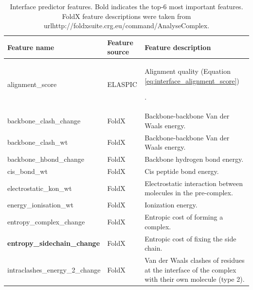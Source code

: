 \begin{table}[tb]
	\centering
	\caption[Interface predictor features.]{Interface predictor features. Bold indicates the top-6 most important features. FoldX feature descriptions were taken from url{http://foldxsuite.crg.eu/command/AnalyseComplex}.}
	\label{tab:interface_features}
	\begin{tabular}{ l | l | p{8cm} }
		\toprule
		Feature name                          & Feature source & Feature description                                                                                 \\
		\midrule
		alignment\_score                      & ELASPIC        & Alignment quality (Equation \ref{eq:interface_alignment_score})\par.                                \\
		backbone\_clash\_change               & FoldX          & Backbone-backbone Van der Waals energy.                                                             \\
		backbone\_clash\_wt                   & FoldX          & Backbone-backbone Van der Waals energy.                                                             \\
		backbone\_hbond\_change               & FoldX          & Backbone hydrogen bond energy.                                                                      \\
		cis\_bond\_wt                         & FoldX          & Cis peptide bond energy.                                                                            \\
		electrostatic\_kon\_wt                & FoldX          & Electrostatic interaction between molecules in the pre-complex.                                     \\
		energy\_ionisation\_wt                & FoldX          & Ionization energy.                                                                                  \\
		entropy\_complex\_change              & FoldX          & Entropic cost of forming a complex.                                                                 \\
		\textbf{entropy\_sidechain\_change}   & FoldX          & Entropic cost of fixing the side chain.                                                             \\
		intraclashes\_energy\_2\_change       & FoldX          & Van der Waals clashes of residues at the interface of the complex with their own molecule (type 2). \\

\end{tabular}
\end{table}
